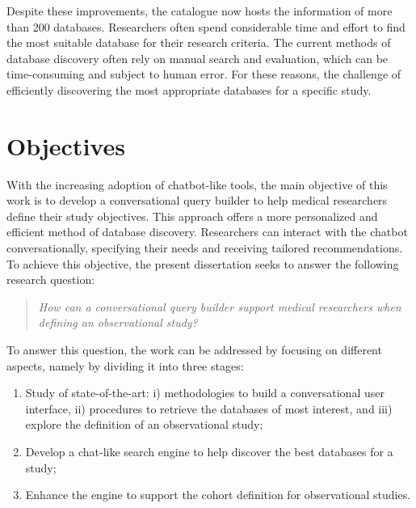 Despite these improvements, the catalogue now hosts the information of more than 200 databases. Researchers often spend considerable time and effort to find the most suitable database for their research criteria. The current methods of database discovery often rely on manual search and evaluation, which can be time-consuming and subject to human error. For these reasons, the challenge of efficiently discovering the most appropriate databases for a specific study. 



\section{Objectives}
\label{objectives}

With the increasing adoption of chatbot-like tools, the main objective of this work is to develop a conversational query builder to help medical researchers define their study objectives. This approach offers a more personalized and efficient method of database discovery. Researchers can interact with the chatbot conversationally, specifying their needs and receiving tailored recommendations. To achieve this objective, the present dissertation seeks to answer the following research question:

\begin{quote}
    \small\textit{How can a conversational query builder support medical researchers when defining an observational study?}
\end{quote}

To answer this question, the work can be addressed by focusing on different aspects, namely by dividing it into three stages:

\begin{enumerate}
    \item Study of state-of-the-art: i) methodologies to build a conversational user interface, ii) procedures to retrieve the databases of most interest, and iii) explore the definition of an observational study;
    \item Develop a chat-like search engine to help discover the best databases for a study;
    \item Enhance the engine to support the cohort definition for observational studies. 
\end{enumerate}


